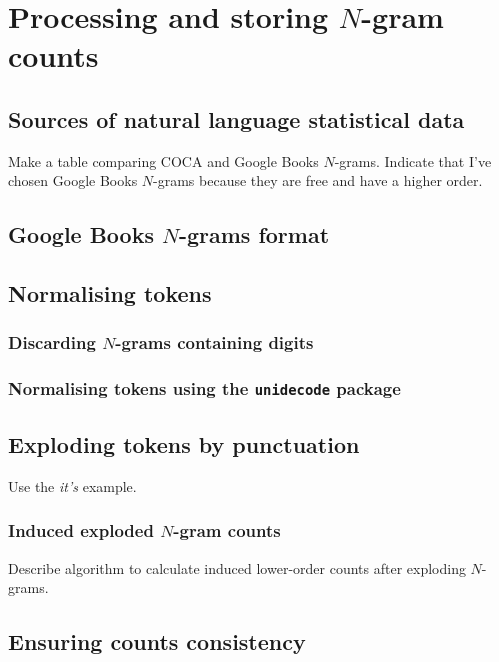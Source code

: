 \documentclass{IIBproject}
\begin{document}
\section{Processing and storing $N$-gram counts}

\subsection{Sources of natural language statistical data}

Make a table comparing COCA and Google Books $N$-grams. Indicate that I've chosen Google Books $N$-grams because they are free and have a higher order.

\subsection{Google Books $N$-grams format}

\subsection{Normalising tokens}

\subsubsection{Discarding $N$-grams containing digits}

\subsubsection{Normalising tokens using the \texttt{unidecode} package}

\subsection{Exploding tokens by punctuation}

Use the \emph{it's} example.

\subsubsection{Induced exploded $N$-gram counts}

Describe algorithm to calculate induced lower-order counts after exploding $N$-grams.

\subsection{Ensuring counts consistency}
\end{document}
